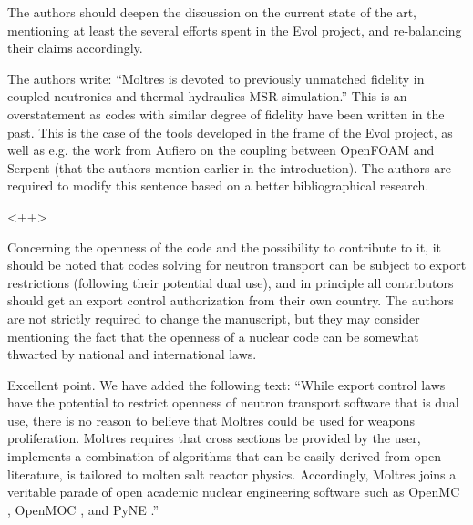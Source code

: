 \documentclass[answers,11pt]{exam}
\begin{document}
\begin{questions}
\question The authors should deepen the discussion on the current state of the art, mentioning at least the several efforts spent in the Evol project, and re-balancing their claims accordingly.

\question The authors write:
``Moltres is devoted to previously unmatched fidelity in coupled neutronics and 
        thermal hydraulics MSR simulation.''
This is an overstatement as codes with similar degree of fidelity have been written in the past. This is the case of the tools developed in the frame of the Evol project, as well as e.g. the work from Aufiero on the coupling between OpenFOAM and Serpent (that the authors mention earlier in the introduction). The authors are required to modify this sentence based on a better bibliographical research.
\begin{solution}
        <++>
\end{solution}

\question Concerning the openness of the code and the possibility to contribute to it, it should be noted that codes solving for neutron transport can be subject to export restrictions (following their potential dual use), and in principle all contributors should get an export control authorization from their own country. The authors are not strictly required to change the manuscript, but they may consider mentioning the fact that the openness of a nuclear code can be somewhat thwarted by national and international laws.
\begin{solution}
	Excellent point. We have added the following text: ``While export
control laws have the potential to restrict openness of neutron transport
software that is dual use, there is no reason to believe that Moltres could be
used for weapons proliferation.  Moltres requires that cross sections be
provided by the user, implements a combination of algorithms that can be easily
derived from open literature, is tailored to molten salt reactor physics.
Accordingly, Moltres joins a veritable parade of open academic nuclear
engineering software such as OpenMC \cite{romano_openmc:_2015},
OpenMOC \cite{boyd_openmoc_2014}, and
PyNE \cite{bates_pyne_2014,biondo_quality_2014}.'' 

\end{solution}


\end{questions}
\end{document}
